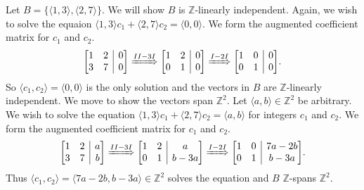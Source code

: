 \documentclass[12pt]{article}
\makeatletter
\newenvironment{amatrix}[1]{%
            \left[\begin{array}{@{}*{#1}{c}|c@{}}
        }{%
            \end{array}\right]
        }
\newcommand{\Z}{\mathbb{Z}}
\newenvironment{exercise}[2][Exercise]{\begin{trivlist}
        \item[\hskip \labelsep {\bfseries #1}\hskip \labelsep {\bfseries #2.}]}{\end{trivlist}}
\makeatother
\begin{document}
\begin{exercise}{38}
\begin{enumerate}[label=(\alph*)]
            Let \( B = \{ \langle 1,3 \rangle , \langle 2,7 \rangle \} . \) We will show \( B \) is \( \Z \)-linearly independent. Again, we wish to solve the equaion \( \langle 1,3 \rangle c_{1} + \langle 2,7 \rangle c_{2} = \langle 0,0 \rangle .\) We form the augmented coefficient matrix for \( c_{1} \) and \( c_{2} . \)
            $$ \begin{amatrix}{2}
                1 & 2 & 0\\
                3 & 7 & 0
            \end{amatrix}\xRightarrow{II - 3I} \begin{amatrix}{2}
                1 & 2 & 0\\
                0 & 1 & 0
            \end{amatrix} \xRightarrow{I-2I}
            \begin{amatrix}{2}
                1 & 0 & 0\\
                0 & 1 & 0
            \end{amatrix} .$$
            So \( \langle c_{1} , c_{2} \rangle = \langle 0,0 \rangle \) is the only solution and the vectors in \( B \) are \( \Z \)-linearly independent. We move to show the vectors span \( \Z^{2} . \) Let \( \langle a,b \rangle \in \Z^{2} \) be arbitrary. We wish to solve the equation \( \langle 1,3 \rangle c_{1} + \langle 2,7 \rangle c_{2} = \langle a,b \rangle \) for integers \( c_{1} \) and \( c_{2} . \) We form the augmented coefficient matrix for \( c_{1} \) and \( c_{2} . \)
            $$ \begin{amatrix}{2}
                1 & 2 & a\\
                3 & 7 & b
            \end{amatrix}\xRightarrow{II - 3I} \begin{amatrix}{2}
                1 & 2 & a\\
                0 & 1 & b-3a
            \end{amatrix} \xRightarrow{I-2I}
            \begin{amatrix}{2}
                1 & 0 & 7a - 2b\\
                0 & 1 & b-3a
            \end{amatrix} .$$
            Thus \( \langle c_{1} , c_{2} \rangle = \langle 7a - 2b , b-3a \rangle \in \Z^{2} \) solves the equation and \( B \) \( \Z \)-spans \( \Z^{2} . \)


\end{enumerate}
\end{exercise}
\end{document}

